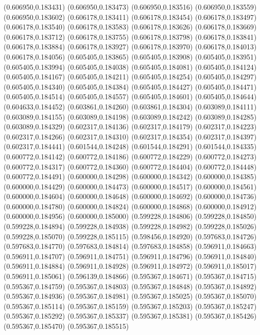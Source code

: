 (0.606950,0.183431)
(0.606950,0.183473)
(0.606950,0.183516)
(0.606950,0.183559)
(0.606950,0.183602)
(0.606178,0.183411)
(0.606178,0.183454)
(0.606178,0.183497)
(0.606178,0.183540)
(0.606178,0.183583)
(0.606178,0.183626)
(0.606178,0.183669)
(0.606178,0.183712)
(0.606178,0.183755)
(0.606178,0.183798)
(0.606178,0.183841)
(0.606178,0.183884)
(0.606178,0.183927)
(0.606178,0.183970)
(0.606178,0.184013)
(0.606178,0.184056)
(0.605405,0.183865)
(0.605405,0.183908)
(0.605405,0.183951)
(0.605405,0.183994)
(0.605405,0.184038)
(0.605405,0.184081)
(0.605405,0.184124)
(0.605405,0.184167)
(0.605405,0.184211)
(0.605405,0.184254)
(0.605405,0.184297)
(0.605405,0.184340)
(0.605405,0.184384)
(0.605405,0.184427)
(0.605405,0.184471)
(0.605405,0.184514)
(0.605405,0.184557)
(0.605405,0.184601)
(0.605405,0.184644)
(0.604633,0.184452)
(0.603861,0.184260)
(0.603861,0.184304)
(0.603089,0.184111)
(0.603089,0.184155)
(0.603089,0.184198)
(0.603089,0.184242)
(0.603089,0.184285)
(0.603089,0.184329)
(0.602317,0.184136)
(0.602317,0.184179)
(0.602317,0.184223)
(0.602317,0.184266)
(0.602317,0.184310)
(0.602317,0.184354)
(0.602317,0.184397)
(0.602317,0.184441)
(0.601544,0.184248)
(0.601544,0.184291)
(0.601544,0.184335)
(0.600772,0.184142)
(0.600772,0.184186)
(0.600772,0.184229)
(0.600772,0.184273)
(0.600772,0.184317)
(0.600772,0.184360)
(0.600772,0.184404)
(0.600772,0.184448)
(0.600772,0.184491)
(0.600000,0.184298)
(0.600000,0.184342)
(0.600000,0.184385)
(0.600000,0.184429)
(0.600000,0.184473)
(0.600000,0.184517)
(0.600000,0.184561)
(0.600000,0.184604)
(0.600000,0.184648)
(0.600000,0.184692)
(0.600000,0.184736)
(0.600000,0.184780)
(0.600000,0.184824)
(0.600000,0.184868)
(0.600000,0.184912)
(0.600000,0.184956)
(0.600000,0.185000)
(0.599228,0.184806)
(0.599228,0.184850)
(0.599228,0.184894)
(0.599228,0.184938)
(0.599228,0.184982)
(0.599228,0.185026)
(0.599228,0.185070)
(0.599228,0.185115)
(0.598456,0.184920)
(0.597683,0.184726)
(0.597683,0.184770)
(0.597683,0.184814)
(0.597683,0.184858)
(0.596911,0.184663)
(0.596911,0.184707)
(0.596911,0.184751)
(0.596911,0.184796)
(0.596911,0.184840)
(0.596911,0.184884)
(0.596911,0.184928)
(0.596911,0.184972)
(0.596911,0.185017)
(0.596911,0.185061)
(0.596139,0.184866)
(0.595367,0.184671)
(0.595367,0.184715)
(0.595367,0.184759)
(0.595367,0.184803)
(0.595367,0.184848)
(0.595367,0.184892)
(0.595367,0.184936)
(0.595367,0.184981)
(0.595367,0.185025)
(0.595367,0.185070)
(0.595367,0.185114)
(0.595367,0.185159)
(0.595367,0.185203)
(0.595367,0.185247)
(0.595367,0.185292)
(0.595367,0.185337)
(0.595367,0.185381)
(0.595367,0.185426)
(0.595367,0.185470)
(0.595367,0.185515)

